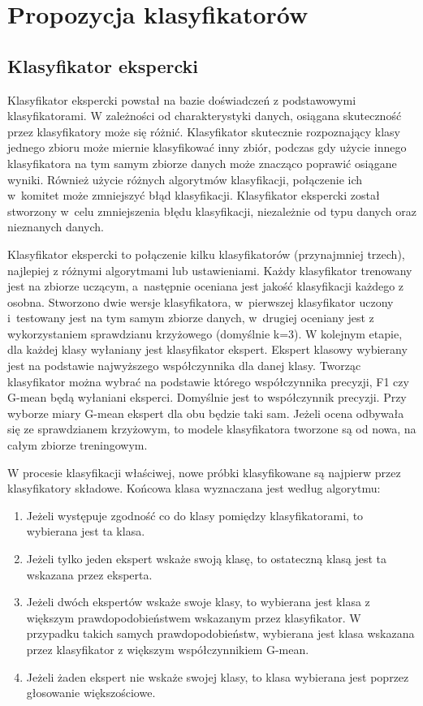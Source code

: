 \chapter{Propozycja klasyfikatorów}
\section{Klasyfikator ekspercki}
Klasyfikator ekspercki powstał na bazie doświadczeń z podstawowymi klasyfikatorami. W zależności od charakterystyki danych, osiągana skuteczność przez klasyfikatory może się różnić. Klasyfikator skutecznie rozpoznający klasy jednego zbioru może miernie klasyfikować inny zbiór, podczas gdy użycie innego klasyfikatora na tym samym zbiorze danych może znacząco poprawić osiągane wyniki. Również użycie różnych algorytmów klasyfikacji, połączenie ich w~komitet może zmniejszyć błąd klasyfikacji. 
Klasyfikator ekspercki został stworzony w~celu zmniejszenia błędu klasyfikacji, niezależnie od typu danych oraz nieznanych danych. \par
Klasyfikator ekspercki to połączenie kilku klasyfikatorów (przynajmniej trzech), najlepiej z różnymi algorytmami lub ustawieniami. Każdy klasyfikator trenowany jest na zbiorze uczącym, a~następnie oceniana jest jakość klasyfikacji każdego z osobna. Stworzono dwie wersje klasyfikatora, w~pierwszej klasyfikator uczony i~testowany jest na tym samym zbiorze danych, w~drugiej oceniany jest z wykorzystaniem sprawdzianu krzyżowego (domyślnie k=3). W kolejnym etapie, dla każdej klasy wyłaniany jest klasyfikator ekspert. Ekspert klasowy wybierany jest na podstawie najwyższego współczynnika dla danej klasy. Tworząc klasyfikator można wybrać na podstawie którego współczynnika precyzji, F1 czy G-mean będą wyłaniani eksperci. Domyślnie jest to współczynnik precyzji. Przy wyborze miary G-mean ekspert dla obu będzie taki sam. Jeżeli ocena odbywała się ze sprawdzianem krzyżowym, to modele klasyfikatora tworzone są od nowa, na całym zbiorze treningowym. \par
W procesie klasyfikacji właściwej, nowe próbki klasyfikowane są najpierw przez klasyfikatory składowe. Końcowa klasa wyznaczana jest według algorytmu:
\begin{enumerate}
	\item Jeżeli występuje zgodność co do klasy pomiędzy klasyfikatorami, to wybierana jest ta klasa.
	\item Jeżeli tylko jeden ekspert wskaże swoją klasę, to ostateczną klasą jest ta wskazana przez eksperta.
	\item Jeżeli dwóch ekspertów wskaże swoje klasy, to wybierana jest klasa z większym prawdopodobieństwem wskazanym przez klasyfikator. W przypadku takich samych prawdopodobieństw, wybierana jest klasa wskazana przez klasyfikator z większym współczynnikiem G-mean.
	\item Jeżeli żaden ekspert nie wskaże swojej klasy, to klasa wybierana jest poprzez głosowanie większościowe.
\end{enumerate}
